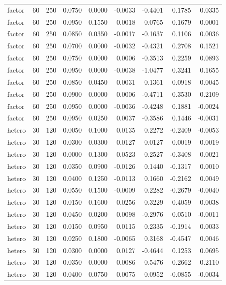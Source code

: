 \begin{tabular}{lrrrrrrrr}
factor & 60 & 250 & 0.0750 & 0.0000 & -0.0033 & -0.4401 & 0.1785 & 0.0335 \\
factor & 60 & 250 & 0.0950 & 0.1550 & 0.0018 & 0.0765 & -0.1679 & 0.0001 \\
factor & 60 & 250 & 0.0850 & 0.0350 & -0.0017 & -0.1637 & 0.1106 & 0.0036 \\
factor & 60 & 250 & 0.0700 & 0.0000 & -0.0032 & -0.4321 & 0.2708 & 0.1521 \\
factor & 60 & 250 & 0.0750 & 0.0000 & 0.0006 & -0.3513 & 0.2259 & 0.0893 \\
factor & 60 & 250 & 0.0950 & 0.0000 & -0.0038 & -1.0477 & 0.3241 & 0.1655 \\
factor & 60 & 250 & 0.0850 & 0.0450 & 0.0031 & -0.1361 & 0.0918 & 0.0045 \\
factor & 60 & 250 & 0.0900 & 0.0000 & 0.0006 & -0.4711 & 0.3530 & 0.2109 \\
factor & 60 & 250 & 0.0950 & 0.0000 & -0.0036 & -0.4248 & 0.1881 & -0.0024 \\
factor & 60 & 250 & 0.0950 & 0.0250 & 0.0037 & -0.3586 & 0.1446 & -0.0031 \\
hetero & 30 & 120 & 0.0050 & 0.1000 & 0.0135 & 0.2272 & -0.2409 & -0.0053 \\
hetero & 30 & 120 & 0.0300 & 0.0300 & -0.0127 & -0.0127 & -0.0019 & -0.0019 \\
hetero & 30 & 120 & 0.0000 & 0.1300 & 0.0523 & 0.2527 & -0.3408 & 0.0021 \\
hetero & 30 & 120 & 0.0350 & 0.0900 & -0.0126 & 0.1440 & -0.1317 & 0.0010 \\
hetero & 30 & 120 & 0.0400 & 0.1250 & -0.0113 & 0.1660 & -0.2162 & 0.0049 \\
hetero & 30 & 120 & 0.0550 & 0.1500 & -0.0009 & 0.2282 & -0.2679 & -0.0040 \\
hetero & 30 & 120 & 0.0150 & 0.1600 & -0.0256 & 0.3229 & -0.4059 & 0.0038 \\
hetero & 30 & 120 & 0.0450 & 0.0200 & 0.0098 & -0.2976 & 0.0510 & -0.0011 \\
hetero & 30 & 120 & 0.0150 & 0.0950 & 0.0115 & 0.2335 & -0.1914 & 0.0033 \\
hetero & 30 & 120 & 0.0250 & 0.1800 & -0.0065 & 0.3168 & -0.4547 & 0.0046 \\
hetero & 30 & 120 & 0.0300 & 0.0000 & 0.0127 & -0.4644 & 0.1253 & 0.0695 \\
hetero & 30 & 120 & 0.0350 & 0.0000 & -0.0086 & -0.5476 & 0.2662 & 0.2110 \\
hetero & 30 & 120 & 0.0400 & 0.0750 & 0.0075 & 0.0952 & -0.0855 & -0.0034 \\

\end{tabular}
